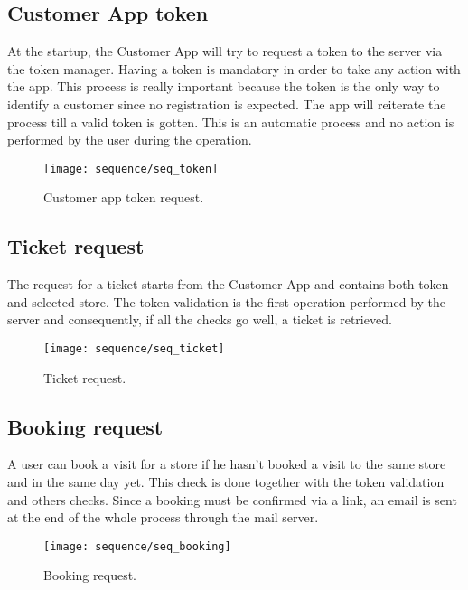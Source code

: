\subsection{Customer App token}
At the startup, the Customer App will try to request a token to the server via the token manager. Having a token is mandatory in order to take any action with the app.\newline
This process is really important because the token is the only way to identify a customer since no registration is expected. The app will reiterate the process till a valid token is gotten.\newline
This is an automatic process and no action is performed by the user during the operation.
\begin{figure}[H]
	\centering
	\texttt{[image: sequence/seq\_token]}
	\caption{Customer app token request.}
	\label{fig:seq_token}
\end{figure}
\clearpage

\subsection{Ticket request}
The request for a ticket starts from the Customer App and contains both token and selected store. The token validation is the first operation performed by the server and consequently, if all the checks go well, a ticket is retrieved.
\vspace{0.1cm}
\begin{figure}[H]
	\centering
	\texttt{[image: sequence/seq\_ticket]}
	\caption{Ticket request.}
	\label{fig:seq_ticket}
\end{figure}

\clearpage

\subsection{Booking request}
A user can book a visit for a store if he hasn't booked a visit to the same store and in the same day yet. This check is done together with the token validation and others checks.\newline
Since a booking must be confirmed via a link, an email is sent at the end of the whole process through the mail server.
\begin{figure}[H]
	\centering
	\texttt{[image: sequence/seq\_booking]}
	\caption{Booking request.}
	\label{fig:seq_booking}
\end{figure}

